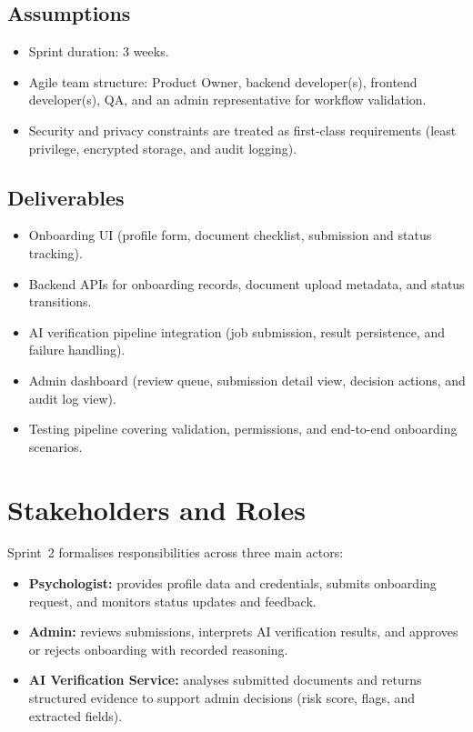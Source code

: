 \documentclass[a4paper,12pt]{report}
\begin{document}
\subsection{Assumptions}
\begin{itemize}
    \item Sprint duration: 3 weeks.
    \item Agile team structure: Product Owner, backend developer(s), frontend
    developer(s), QA, and an admin representative for workflow validation.
    \item Security and privacy constraints are treated as first-class
    requirements (least privilege, encrypted storage, and audit logging).
\end{itemize}

\subsection{Deliverables}
\begin{itemize}
    \item Onboarding UI (profile form, document checklist, submission and status
    tracking).
    \item Backend APIs for onboarding records, document upload metadata, and
    status transitions.
    \item AI verification pipeline integration (job submission, result
    persistence, and failure handling).
    \item Admin dashboard (review queue, submission detail view, decision
    actions, and audit log view).
    \item Testing pipeline covering validation, permissions, and end-to-end
    onboarding scenarios.
\end{itemize}

\section{Stakeholders and Roles}
\label{sec:sprint2-stakeholders}

Sprint~2 formalises responsibilities across three main actors:

\begin{itemize}
    \item \textbf{Psychologist:} provides profile data and credentials, submits
    onboarding request, and monitors status updates and feedback.
    \item \textbf{Admin:} reviews submissions, interprets AI verification
    results, and approves or rejects onboarding with recorded reasoning.
    \item \textbf{AI Verification Service:} analyses submitted documents and
    returns structured evidence to support admin decisions (risk score, flags,
    and extracted fields).
\end{itemize}
\end{document}
